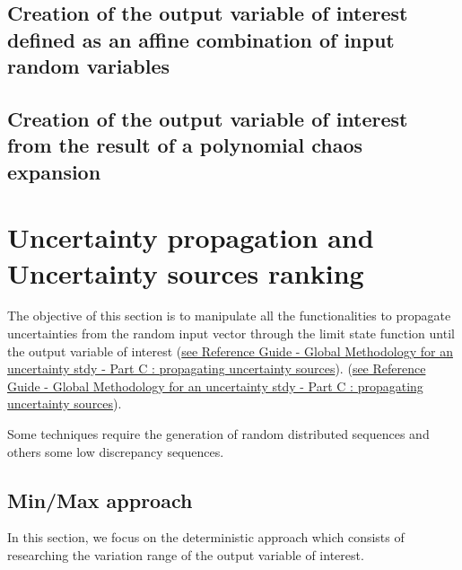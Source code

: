 
\newpage 


\newpage \subsection{Creation of the output variable of interest defined as an affine combination of input random variables}






\newpage \subsection{Creation of the output variable of interest from the result of a polynomial chaos expansion}


\newpage 

\newpage \section{Uncertainty propagation and Uncertainty sources ranking}

The objective of this section is to manipulate all the functionalities to propagate uncertainties from the random input vector through the limit state function until the output variable of interest
\ifpdf
(\href{OpenTURNS_ReferenceGuide.pdf}{see Reference Guide - Global Methodology for an uncertainty stdy - Part C : propagating uncertainty sources}).
\else
(\href{../ReferenceGuide/index.xhtml}{see Reference Guide - Global Methodology for an uncertainty stdy - Part C : propagating uncertainty sources}).
\fi

Some techniques require the generation of random distributed sequences and others some low discrepancy sequences.


\newpage 



\newpage \subsection{Min/Max approach}


In this section, we focus on the deterministic approach which consists of researching the variation range of the output variable of interest.


